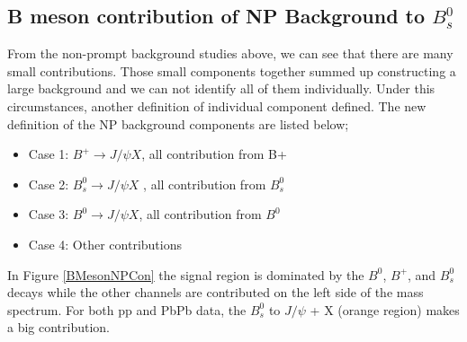  
\subsection{B meson contribution of NP Background to $B^0_s$}


From the non-prompt background studies above, we can see that there are many small contributions. Those small components together summed up constructing a large background and we can not identify all of them individually. Under this circumstances, another definition of individual component defined. The new definition of the NP background components are listed below;

\begin{itemize}
\item {Case 1: $ B^{+} \rightarrow J/\psi X $, all contribution from B+}
\item {Case 2: $ B_{s}^{0} \rightarrow J/\psi X $ , all contribution from $ B_{s}^{0} $ }
\item {Case 3: $ B^{0} \rightarrow J/\psi X$, all contribution from $ B^{0}$}
\item {Case 4: Other contributions}
\end{itemize}

In Figure \ref{BMesonNPCon} the signal region is dominated by the $B^{0}$, $B^{+}$, and $B_{s}^{0} $ decays while the other channels are contributed on the left side of the mass spectrum. For both pp and PbPb data, the $B^{0}_{s} $ to $J/\psi$ + X  (orange region) makes a big contribution.

